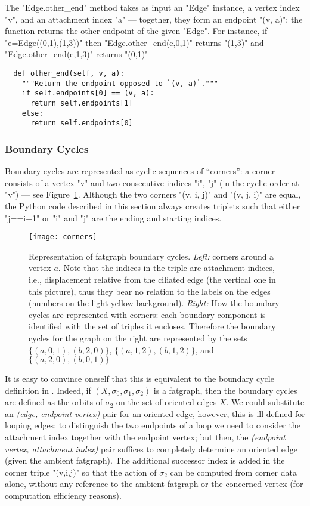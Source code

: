 The "Edge.other_end" method takes as input an "Edge" instance, a
vertex index "v", and an attachment index "a" --- together, they
form an endpoint "(v, a)"; the function returns the other endpoint
of the given "Edge".  For instance, if "e=Edge((0,1),(1,3))"
then "Edge.other_end(e,0,1)" returns "(1,3)" and
"Edge.other_end(e,1,3)" returns "(0,1)"
\begin{lstlisting}
  def other_end(self, v, a):
    """Return the endpoint opposed to `(v, a)`."""
    if self.endpoints[0] == (v, a):
      return self.endpoints[1]
    else:
      return self.endpoints[0]

\end{lstlisting}




\subsubsection{Boundary Cycles}
\label{sec:boundary-cycles}

Boundary cycles are represented as cyclic sequences of ``corners'': a
corner consists of a vertex "v" and two consecutive indices "i", "j"
(in the cyclic order at "v") --- see Figure~\ref{fig:corners}. 
Although the two corners "(v, i, j)" and "(v, j, i)" are equal, the
Python code described in this section always creates triplets such that
either "j==i+1" or "i" and "j" are the ending and starting indices.
\begin{figure}
  \centering
  \texttt{[image: corners]}
  \caption{Representation of fatgraph boundary cycles. \emph{Left:}
    corners around a vertex $a$. Note that the indices in the triple
    are attachment indices, i.e., displacement relative from the
    ciliated edge (the vertical one in this picture), thus they bear
    no relation to the labels on the edges (numbers on the light
    yellow background). \emph{Right:} How the boundary cycles are
    represented with corners: each boundary component is identified
    with the set of triples it encloses. Therefore the boundary cycles
    for the graph on the right are represented by the sets $\{(a,0,1),
    (b,2,0)\}$, $\{(a,1,2), (b,1,2)\}$, and $\{(a,2,0), (b,0,1)\}$}
  \label{fig:corners}
\end{figure}
It is easy to convince oneself that this is equivalent to the boundary
cycle definition in .  Indeed, if $(X, \sigma_0,
\sigma_1, \sigma_2)$ is a fatgraph, then the boundary cycles are
defined as the orbits of $\sigma_2$ on the set of oriented edges
$X$. We could substitute an \emph{(edge, endpoint vertex)} pair for an
oriented edge, however, this is ill-defined for looping edges; to
distinguish the two endpoints of a loop we need to consider the
attachment index together with the endpoint vertex; but then, the
\emph{(endpoint vertex, attachment index)} pair suffices to completely
determine an oriented edge (given the ambient fatgraph).  The
additional successor index is added in the corner triple "(v,i,j)"
so that the action of $\sigma_2$ can be computed from corner data
alone, without any reference to the ambient fatgraph or the concerned
vertex (for computation efficiency reasons).

